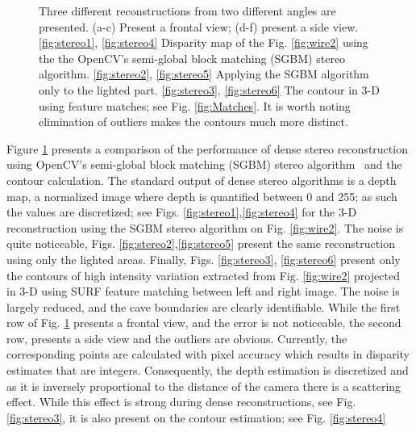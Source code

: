 \begin{figure}[ht]
\begin{center}
\begin{tabular}{ccc}
		\end{tabular}
	\end{center}
	\caption{Three different reconstructions from two different angles are presented. (a-c) Present a frontal view; (d-f) present a side view. \ref{fig:stereo1}, \ref{fig:stereo4} Disparity map of the Fig. \ref{fig:wire2} using the the OpenCV's semi-global block matching (SGBM) stereo algorithm.   \ref{fig:stereo2}, \ref{fig:stereo5} Applying the SGBM algorithm only to the lighted part.    \ref{fig:stereo3}, \ref{fig:stereo6} The contour in 3\hyp D using feature matches; see Fig. \ref{fig:Matches}. It is worth noting  elimination of outliers makes the contours much more distinct. }
	\label{fig:stereo}
\end{figure}

Figure \ref{fig:stereo} presents a comparison of the performance of dense stereo reconstruction using OpenCV's semi-global block matching (SGBM) stereo algorithm~\cite{hirschmuller2008stereo} and the contour calculation. The standard output of dense stereo algorithms is a depth map, a normalized image where depth is quantified between 0 and 255; as such the values are discretized; see Figs. \ref{fig:stereo1},\ref{fig:stereo4} for the 3\hyp D reconstruction using the SGBM stereo algorithm on Fig. \ref{fig:wire2}. The noise is quite noticeable, Figs. \ref{fig:stereo2},\ref{fig:stereo5} present  the same reconstruction using only the lighted areas. Finally, Figs. \ref{fig:stereo3}, \ref{fig:stereo6} present  only the contours of high intensity variation extracted from Fig. \ref{fig:wire2} projected in 3\hyp D using SURF feature matching between left and right image. The noise is largely reduced, and the cave boundaries are clearly identifiable. While the first row of Fig. \ref{fig:stereo} presents a frontal view, and the error is not noticeable, the second row, presents a side view and the outliers are obvious. Currently, the corresponding points are calculated with pixel accuracy which results in disparity estimates that are integers. Consequently, the depth estimation is discretized and as it is inversely proportional to the distance of the camera there is a scattering effect. While this effect is strong during dense reconstructions, see Fig. \ref{fig:stereo3}, it is also present on the contour estimation; see Fig. \ref{fig:stereo4}